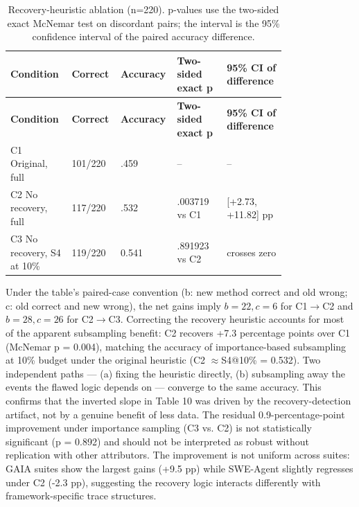 \documentclass[preprint,12pt]{elsarticle}
\begin{document}
\begin{center}
\begingroup
\setlength{\tabcolsep}{2pt}
\renewcommand{\arraystretch}{1.16}
\footnotesize
\begin{longtable}{|p{0.202\linewidth}|p{0.127\linewidth}|p{0.10\linewidth}|p{0.173\linewidth}|p{0.189\linewidth}|}
\caption{Recovery-heuristic ablation (n=220). p-values use the two-sided exact McNemar test on discordant pairs; the interval is the 95\% confidence interval of the paired accuracy difference.}\label{tab:v5_11}\\
\hline
\textbf{Condition} & \textbf{Correct} & \textbf{Accuracy} & \textbf{Two-sided exact p} & \textbf{95\% CI of difference} \\ \hline
\endfirsthead
\textbf{Condition} & \textbf{Correct} & \textbf{Accuracy} & \textbf{Two-sided exact p} & \textbf{95\% CI of difference} \\ \hline
\endhead
C1 Original, full & 101/220 & .459 & -- & -- \\ \hline
C2 No recovery, full & 117/220 & .532 & .003719 vs C1 & [+2.73, +11.82] pp \\ \hline
C3 No recovery, S4 at 10\% & 119/220 & 0.541 & .891923 vs C2 & crosses zero \\ \hline
\end{longtable}
\endgroup
\end{center}
Under the table's paired-case convention (b: new method correct and old wrong;
c: old correct and new wrong), the net gains imply $b=22,c=6$ for
C1$\rightarrow$C2 and $b=28,c=26$ for C2$\rightarrow$C3.
Correcting the recovery heuristic accounts for most of the apparent subsampling benefit: C2 recovers +7.3 percentage points over C1 (McNemar p = 0.004), matching the accuracy of importance-based subsampling at 10\% budget under the original heuristic (C2 $\approx$S4@10\% = 0.532). Two independent paths --- (a) fixing the heuristic directly, (b) subsampling away the events the flawed logic depends on --- converge to the same accuracy. This confirms that the inverted slope in Table 10 was driven by the recovery-detection artifact, not by a genuine benefit of less data. The residual 0.9-percentage-point improvement under importance sampling (C3 vs. C2) is not statistically significant (p = 0.892) and should not be interpreted as robust without replication with other attributors. The improvement is not uniform across suites: GAIA suites show the largest gains (+9.5 pp) while SWE-Agent slightly regresses under C2 (-2.3 pp), suggesting the recovery logic interacts differently with framework-specific trace structures.
\end{document}
